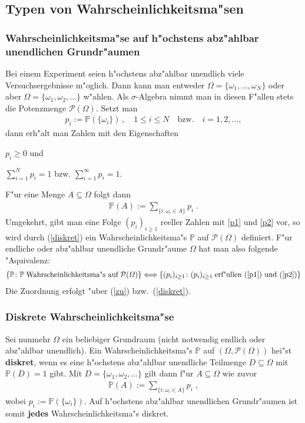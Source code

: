 \documentclass[ngerman,draft,parskip=half,twoside]{scrartcl}
\newcommand*{\PotM}{\mathcal{P}}    %
\newcommand*{\WKM}{\mathbb{P}}      %
\begin{document}
\subsection{Typen von Wahrscheinlichkeitsma"sen}
\subsubsection{Wahrscheinlichkeitsma"se auf h"ochstens abz"ahlbar unendlichen Grundr"aumen}
Bei einem Experiment seien h"ochstens abz"ahlbar unendlich viele Versuchsergebnisse
m"oglich. Dann kann man entweder $\Omega=\{\omega_1,\ldots,\omega_N\}$ oder
aber $\Omega=\{\omega_1,\omega_2,\ldots\}$ w"ahlen. Als $\sigma$-Algebra nimmt man in diesen
F"allen stets die Potenzmenge $\PotM(\Omega)$. Setzt man
\begin{gather}
\label{zu}
p_i :=\WKM(\{\omega_i\})\,,\quad 1\le i\le N\quad\mbox{bzw.}\quad i=1,2,\ldots,
\end{gather}
dann erh"alt man Zahlen mit den Eigenschaften
\begin{eigenschaften}
 \item $p_i\ge 0$ und
  \label{p1}
 \item $\sum_{i=1}^N p_i =1$ bzw. $\sum_{i=1}^\infty p_i =1$.
  \label{p2}
\end{eigenschaften}
F"ur eine Menge $A\subseteq \Omega$ folgt dann
\begin{gather}
\label{diskret}
\WKM(A):= \sum_{\{i\colon \omega_i\in A\}} p_i\;.
\end{gather}
Umgekehrt, gibt man eine Folge $(p_i)_{i\ge 1}$ reeller Zahlen mit \ref{p1} und \ref{p2} vor,
so wird durch (\ref{diskret}) ein Wahrscheinlichkeitsma"s $\WKM$ auf $\PotM(\Omega)$ definiert. F"ur
endliche oder abz"ahlbar unendliche Grundr"aume $\Omega$ hat man also folgende "Aquivalenz:
\begin{gather*}
  \{\WKM\colon \WKM\;\mbox{Wahrscheinlichkeitsma"s auf}\;\PotM(\Omega)\}
     \Longleftrightarrow\{(p_i)_{i\ge 1}\colon (p_i)_{i\ge 1}\;\mbox{erf"ullen (\ref{p1}) und (\ref{p2})}\}
\end{gather*}
Die Zuordnung erfolgt "uber (\ref{zu}) bzw.~(\ref{diskret}).

\subsubsection{Diskrete Wahrscheinlichkeitsma"se}
Sei nunmehr $\Omega$ ein beliebiger Grundraum (nicht notwendig endlich
oder abz"ahlbar unendlich). Ein Wahrscheinlichkeitsma"s $\WKM$ auf $(\Omega,\PotM(\Omega))$
hei"st \textbf{diskret}, wenn es eine h"ochstens abz"ahlbar unendliche Teilmenge $D\subseteq \Omega$
mit $\WKM(D)=1$ gibt. Mit $D=\{\omega_1,\omega_2,\ldots\}$ gilt dann f"ur $A\subseteq \Omega$ wie zuvor
\begin{gather*}
  \WKM(A):= \sum_{\{i\colon \omega_i\in A\}} p_i\;,
\end{gather*}
wobei $p_i:=\WKM(\{\omega_i\})$. Auf h"ochstens abz"ahlbar unendlichen Grundr"aumen ist somit \textbf{jedes}
Wahrscheinlichkeitsma"s diskret.
\end{document}
